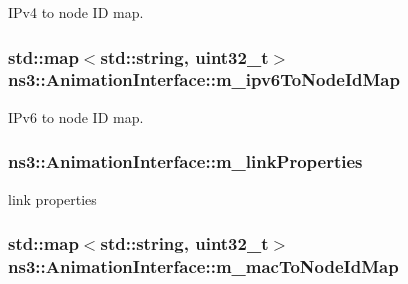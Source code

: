 I\+Pv4 to node ID map. 

\subsubsection[{\texorpdfstring{m\+\_\+ipv6\+To\+Node\+Id\+Map}{m_ipv6ToNodeIdMap}}]{\setlength{\rightskip}{0pt plus 5cm}std\+::map$<$std\+::string, uint32\+\_\+t$>$ ns3\+::\+Animation\+Interface\+::m\+\_\+ipv6\+To\+Node\+Id\+Map\hspace{0.3cm}{\ttfamily [private]}}\hypertarget{classns3_1_1AnimationInterface_a210f45afded4e4f536aa41df0554a25e}{}\label{classns3_1_1AnimationInterface_a210f45afded4e4f536aa41df0554a25e}


I\+Pv6 to node ID map. 

\subsubsection[{\texorpdfstring{m\+\_\+link\+Properties}{m_linkProperties}}]{ ns3\+::\+Animation\+Interface\+::m\+\_\+link\+Properties\hspace{0.3cm}{\ttfamily [private]}}\hypertarget{classns3_1_1AnimationInterface_a8f40a5be6a97ed9f1e2692a604b27d15}{}\label{classns3_1_1AnimationInterface_a8f40a5be6a97ed9f1e2692a604b27d15}


link properties 

\subsubsection[{\texorpdfstring{m\+\_\+mac\+To\+Node\+Id\+Map}{m_macToNodeIdMap}}]{\setlength{\rightskip}{0pt plus 5cm}std\+::map$<$std\+::string, uint32\+\_\+t$>$ ns3\+::\+Animation\+Interface\+::m\+\_\+mac\+To\+Node\+Id\+Map\hspace{0.3cm}{\ttfamily [private]}}\hypertarget{classns3_1_1AnimationInterface_a4d47d5b16cac7965cc0fbb1c50b3a268}{}\label{classns3_1_1AnimationInterface_a4d47d5b16cac7965cc0fbb1c50b3a268}


